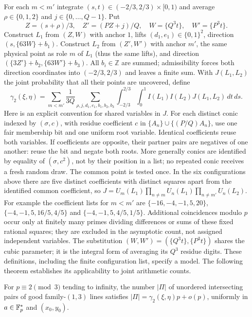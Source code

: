For each $m<m'$ integrate $(s,t)\in(-2/3,2/3)\times[0,1)$ and average $\rho\in\{0,1,2\}$ and $j\in\{0,\dots,Q-1\}$.
Put
\[
 Z=(s+\rho)/3,\quad Z'=(PZ+j)/Q,\quad W=\{Q^3t\},\quad W'=\{P^3t\}.
\]
Construct $L_1$ from $(Z,W)$ with anchor $1$, lifts $(d_1,e_1)\in\{0,1\}^2$, direction $(s,\{63W\}+b_1)$.
Construct $L_2$ from $(Z',W')$ with anchor $m'$, the same physical point as role $m$ of $L_1$ (thus the same lifts),
and direction $(\{3Z'\}+b_2,\{63W'\}+b_3)$.
All $b_i\in\mathbb Z$ are summed; admissibility forces both direction coordinates into $(-2/3,2/3)$ and leaves a finite sum.
With $J(L_1,L_2)$ the joint probability that all their points are uncovered, define
\begin{equation}\label{eq:gamma2}
 \gamma_2(\xi,\eta)=\sum_{m<m'}\frac1{3Q}
 \sum_{\rho,j,d_1,e_1,b_1,b_2,b_3}\int_{-2/3}^{2/3}\!\int_0^1
 I(L_1)I(L_2)J(L_1,L_2)\,dt\,ds .
\end{equation}
Here is an explicit convention for shared variables in $J$.
For each distinct conic indexed by $(\sigma,c)$, with residue coefficient $c$ in
$\{A_n\}\cup\{(P/Q)A_n\}$, use one fair membership bit and one uniform root variable.
Identical coefficients reuse both variables.  If coefficients are opposite, their partner pairs are negatives of one another:
reuse the bit and negate both roots.  More generally conics are identified by equality of $(\sigma,c^2)$,
not by their position in a list; no repeated conic receives a fresh random draw.
The common point is tested once.  In the six configurations above there are five distinct coefficients with distinct squares
apart from the identified common coefficient, so
$J=U_m(L_1)\prod_{n\ne m}U_n(L_1)\prod_{n\ne m'}U_n(L_2)$.
For example the coefficient lists for $m<m'$ are
$\{-16,-4,-1,5,20\}$, $\{-4,-1,5,16/5,4/5\}$ and
$\{-4,-1,5,4/5,1/5\}$.
Additional coincidences modulo $p$ occur only at finitely many primes dividing differences or sums of these fixed rational squares;
they are excluded in the asymptotic count, not assigned independent variables.
The substitution $(W,W')=(\{Q^3t\},\{P^3t\})$ shares the cubic parameter; it is the integral form of averaging its $Q^3$ residue digits.
These definitions, including the finite configuration list, specify a model.  The following theorem establishes its applicability to joint arithmetic counts.

\begin{theorem}\label{hyp:pair}
For $p\equiv2\pmod3$ tending to infinity, the number $|\Pi|$ of unordered intersecting pairs of good family-$(1,3)$ lines satisfies
$|\Pi|=\gamma_2(\xi,\eta)p+o(p)$, uniformly in $a\in\mathbb{F}_p^*$ and $(x_0,y_0)$.
\end{theorem}

